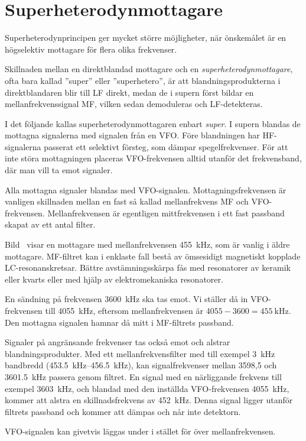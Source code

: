 \section{Superheterodynmottagare}
\label{superheterodynmottagaren}

Superheterodynprincipen ger mycket större möjligheter, när önskemålet
är en högselektiv mottagare för flera olika frekvenser.

Skillnaden mellan en direktblandad mottagare och en
\emph{superheterodynmottagare}, ofta bara kallad ''super'' eller
''superhetero'', är att blandningsprodukterna i direktblandaren blir till
LF direkt, medan de i supern först bildar en mellanfrekvenssignal MF,
vilken sedan demoduleras och LF-detekteras.

I det följande kallas superheterodynmottagaren enbart \emph{super}.
I supern blandas de mottagna signalerna med signalen från en VFO.
Före blandningen har HF-signalerna passerat ett selektivt försteg, som
dämpar spegelfrekvenser.
För att inte störa mottagningen placeras VFO-frekvensen alltid utanför
det frekvensband, där man vill ta emot signaler.

Alla mottagna signaler blandas med VFO-signalen.
Mottagningsfrekvensen är vanligen skillnaden mellan en fast så kallad
mellanfrekvens MF och VFO-frekvensen.
Mellanfrekvensen är egentligen mittfrekvensen i ett fast passband skapat av
ett antal filter.


Bild~ visar en mottagare med mellanfrekvensen
\qty{455}{\kilo\hertz}, som är vanlig i äldre mottagare.
MF-filtret kan i enklaste fall bestå av ömsesidigt magnetiskt kopplade
LC-resonanskretsar.
Bättre avstämningsskärpa fås med resonatorer av keramik eller kvarts eller med
hjälp av elektromekaniska resonatorer.

\begin{exempelbox}
En sändning på frekvensen \qty{3600}{\kilo\hertz} ska tas emot.
Vi ställer då in VFO-frekvensen till \qty{4055}{\kilo\hertz}, eftersom
mellanfrekvensen är \(4055 - 3600 = \qty{455}{\kilo\hertz}\).
Den mottagna signalen hamnar då mitt i MF-filtrets passband.

Signaler på angränsande frekvenser tas också emot och alstrar
blandningsprodukter.
Med ett mellanfrekvensfilter med till exempel \qty{3}{\kilo\hertz} bandbredd
(\SIrange{453,5}{456,5}{\kilo\hertz}), kan signalfrekvenser mellan 3598,5 och
\qty{3601,5}{\kilo\hertz} passera genom filtret.
En signal med en närliggande frekvens till exempel \qty{3603}{\kilo\hertz}, och
blandad med den inställda VFO-frekvensen \qty{4055}{\kilo\hertz}, kommer att
alstra en skillnadsfrekvens av \qty{452}{\kilo\hertz}.
Denna signal ligger utanför filtrets passband och kommer att dämpas och når
inte detektorn.

VFO-signalen kan givetvis läggas under i stället för över mellanfrekvensen.
\end{exempelbox}


